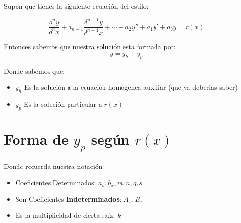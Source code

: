 \documentclass[12pt]{report}                                %
\begin{document}
        Supon que tienes la siguiente ecuación del estilo:

        \begin{equation}
            \frac{d^ny}{d^nx} + a_{n-1}\frac{d^{n-1}y}{d^{n-1}x} + \cdots + a_2y'' + a_1y' + a_0y = r(x)
        \end{equation}

        Entonces sabemos que nuestra solución esta formada por:
        \begin{equation}
            y = y_h + y_p
        \end{equation}

        Donde sabemos que:
        \begin{itemize}
            \item $y_h$ Es la solución a la ecuación homogenea auxiliar (que ya deberias saber)
            \item $y_p$ Es la solución particular a $r(x)$
        \end{itemize}


    \section{Forma de $y_p$ según $r(x)$}

        Donde recuerda nuestra notación:
        \begin{itemize}
            \item Coeficientes Determinados: $a_x, b_x, m, n, q, s$
            \item Son Coeficientes \textbf{Indeterminados}: $A_x , B_x$ 
            \item Es la multiplicidad de cierta raíz: $k$
        \end{itemize}
\end{document}
